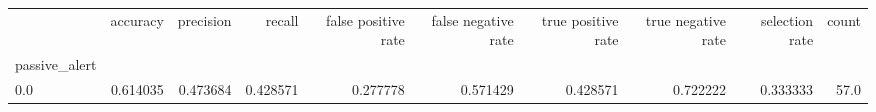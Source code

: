 \begin{tabular}{lrrrrrrrrr}
\toprule
{} &  accuracy &  precision &    recall &  false positive rate &  false negative rate &  true positive rate &  true negative rate &  selection rate &  count \\
passive\_alert &           &            &           &                      &                      &                     &                     &                 &        \\
\midrule
0.0           &  0.614035 &   0.473684 &  0.428571 &             0.277778 &             0.571429 &            0.428571 &            0.722222 &        0.333333 &   57.0 \\
\bottomrule
\end{tabular}
